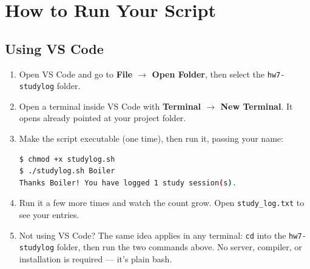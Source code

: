 \documentclass[11pt]{article}
\begin{document}
\section{How to Run Your Script}
\subsection{Using VS Code}
\begin{enumerate}
    \item Open VS Code and go to \textbf{File \(\rightarrow\) Open Folder}, then select the \texttt{hw7-studylog} folder.
    \item Open a terminal inside VS Code with \textbf{Terminal \(\rightarrow\) New Terminal}. It opens already pointed at your project folder.
    \item Make the script executable (one time), then run it, passing your name:
\begin{lstlisting}[language=bash]
$ chmod +x studylog.sh
$ ./studylog.sh Boiler
Thanks Boiler! You have logged 1 study session(s).
\end{lstlisting}
    \item Run it a few more times and watch the count grow. Open \texttt{study\_log.txt} to see your entries.
    \item Not using VS Code? The same idea applies in any terminal: \texttt{cd} into the \texttt{hw7-studylog} folder, then run the two commands above. No server, compiler, or installation is required --- it's plain bash.
\end{enumerate}

\end{document}
